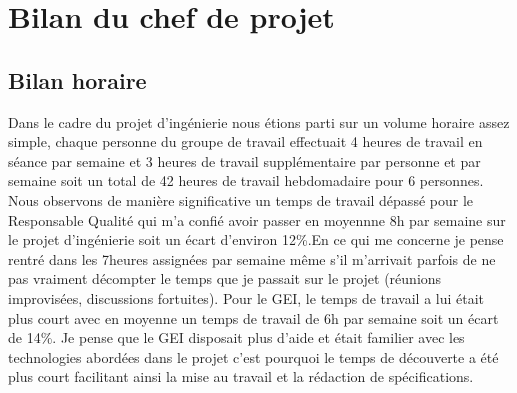 \section{Bilan du chef de projet}
\subsection{Bilan horaire}
Dans le cadre du projet d'ingénierie nous étions parti sur un volume horaire assez simple, chaque personne du groupe de travail effectuait 4 heures de travail en séance par semaine et 3 heures de travail supplémentaire par personne et par semaine soit un total de 42 heures de travail hebdomadaire pour 6 personnes. Nous observons de manière significative un temps de travail dépassé pour le Responsable Qualité qui m'a confié avoir passer en moyennne 8h par semaine sur le projet d'ingénierie soit un écart d'environ 12\%.En ce qui me concerne je pense rentré dans les 7heures assignées par semaine même s'il m'arrivait parfois de ne pas vraiment décompter le temps que je passait sur le projet (réunions improvisées, discussions fortuites). Pour le GEI, le temps de travail a lui était plus court avec en moyenne un temps de travail de 6h par semaine soit un écart de 14\%. Je pense que le GEI disposait plus d'aide et était familier avec les technologies abordées dans le projet c'est pourquoi le temps de découverte a été plus court facilitant ainsi la mise au travail et la rédaction de spécifications.

